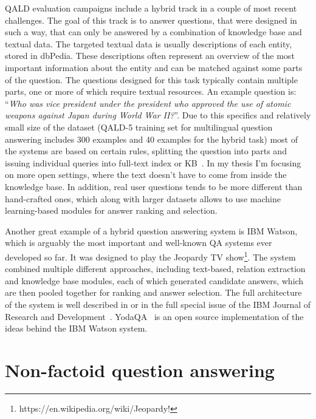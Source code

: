 QALD evaluation campaigns include a hybrid track in a couple of most recent challenges.
The goal of this track is to answer questions, that were designed in such a way, that can only be answered by a combination of knowledge base and textual data.
The targeted textual data is usually descriptions of each entity, stored in dbPedia.
These descriptions often represent an overview of the most important information about the entity and can be matched against some parts of the question.
The questions designed for this task typically contain multiple parts, one or more of which require textual resources.
An example question is: ``\textit{Who was vice president under the president who approved the use of atomic weapons against Japan during World War II?}''.
Due to this specifics and relatively small size of the dataset (QALD-5 training set for multilingual question answering includes 300 examples and 40 examples for the hybrid task) most of the systems are based on certain rules, \eg splitting the question into parts and issuing individual queries into full-text index or KB~\cite{park2015isoft,usbeck2015hawk}.
In my thesis I'm focusing on more open settings, where the text doesn't have to come from inside the knowledge base.
In addition, real user questions tends to be more different than hand-crafted ones, which along with larger datasets allows to use machine learning-based modules for answer ranking and selection.

Another great example of a hybrid question answering system is IBM Watson, which is arguably the most important and well-known QA systems ever developed so far.
It was designed to play the Jeopardy TV show\footnote{https://en.wikipedia.org/wiki/Jeopardy!}.
The system combined multiple different approaches, including text-based, relation extraction and knowledge base modules, each of which generated candidate answers, which are then pooled together for ranking and answer selection.
The full architecture of the system is well described in \cite{ferrucci2010building} or in the full special issue of the IBM Journal of Research and Development~\cite{ibm_watson_special_issue}.
YodaQA~\cite{baudivs2015yodaqa} is an open source implementation of the ideas behind the IBM Watson system.


\section{Non-factoid question answering}
\label{section:relatedwork:non-factoid}

